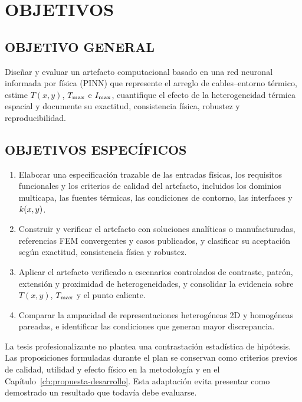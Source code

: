 \section{OBJETIVOS}
\label{sec:objetivos}

\subsection{OBJETIVO GENERAL}

Diseñar y evaluar un artefacto computacional basado en una red neuronal informada por física (PINN) que represente el arreglo de cables--entorno térmico, estime $T(x,y)$, $T_{\max}$ e $I_{\max}$, cuantifique el efecto de la heterogeneidad térmica espacial y documente su exactitud, consistencia física, robustez y reproducibilidad.

\subsection{OBJETIVOS ESPECÍFICOS}

\begin{enumerate}[label=OE\arabic*.]
  \item Elaborar una especificación trazable de las entradas físicas, los requisitos funcionales y los criterios de calidad del artefacto, incluidos los dominios multicapa, las fuentes térmicas, las condiciones de contorno, las interfaces y $k(x,y)$.
  \item Construir y verificar el artefacto con soluciones analíticas o manufacturadas, referencias FEM convergentes y casos publicados, y clasificar su aceptación según exactitud, consistencia física y robustez.
  \item Aplicar el artefacto verificado a escenarios controlados de contraste, patrón, extensión y proximidad de heterogeneidades, y consolidar la evidencia sobre $T(x,y)$, $T_{\max}$ y el punto caliente.
  \item Comparar la ampacidad de representaciones heterogéneas 2D y homogéneas pareadas, e identificar las condiciones que generan mayor discrepancia.
\end{enumerate}

La tesis profesionalizante no plantea una contrastación estadística de hipótesis. Las proposiciones formuladas durante el plan se conservan como criterios previos de calidad, utilidad y efecto físico en la metodología y en el Capítulo~\ref{ch:propuesta-desarrollo}. Esta adaptación evita presentar como demostrado un resultado que todavía debe evaluarse.

